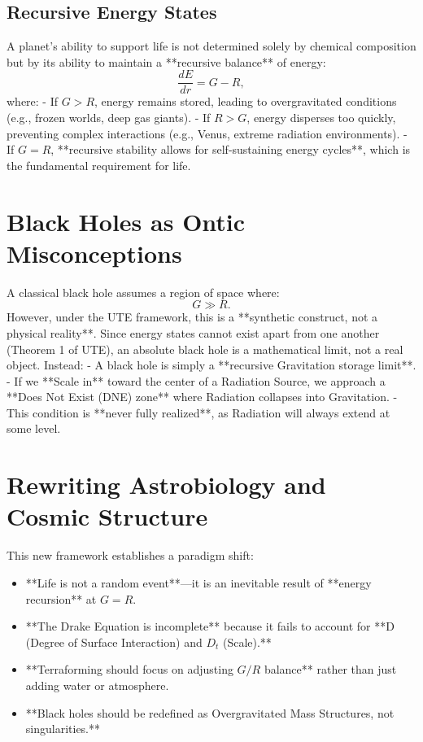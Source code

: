 \documentclass{article}
\begin{document}
\subsection{Recursive Energy States}
A planet's ability to support life is not determined solely by chemical composition but by its ability to maintain a **recursive balance** of energy:
\begin{equation}
    \frac{dE}{dr} = G - R,
\end{equation}
where:
- If $G > R$, energy remains stored, leading to overgravitated conditions (e.g., frozen worlds, deep gas giants).
- If $R > G$, energy disperses too quickly, preventing complex interactions (e.g., Venus, extreme radiation environments).
- If $G = R$, **recursive stability allows for self-sustaining energy cycles**, which is the fundamental requirement for life.

\section{Black Holes as Ontic Misconceptions}
A classical black hole assumes a region of space where:
\begin{equation}
    G \gg R.
\end{equation}
However, under the UTE framework, this is a **synthetic construct, not a physical reality**. Since energy states cannot exist apart from one another (Theorem 1 of UTE), an absolute black hole is a mathematical limit, not a real object. Instead:
- A black hole is simply a **recursive Gravitation storage limit**.
- If we **Scale in** toward the center of a Radiation Source, we approach a **Does Not Exist (DNE) zone** where Radiation collapses into Gravitation.
- This condition is **never fully realized**, as Radiation will always extend at some level.

\section{Rewriting Astrobiology and Cosmic Structure}
This new framework establishes a paradigm shift:
\begin{itemize}
    \item **Life is not a random event**—it is an inevitable result of **energy recursion** at $G = R$.
    \item **The Drake Equation is incomplete** because it fails to account for **D (Degree of Surface Interaction) and $D_t$ (Scale).**
    \item **Terraforming should focus on adjusting $G/R$ balance** rather than just adding water or atmosphere.
    \item **Black holes should be redefined as Overgravitated Mass Structures, not singularities.**
\end{itemize}
\end{document}
